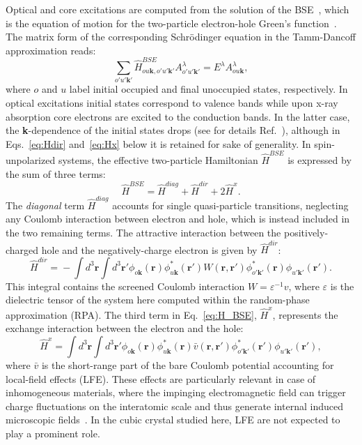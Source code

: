 \documentclass[aps,pra,superscriptaddress,twocolumn]{revtex4}
\begin{document}
Optical and core excitations are computed from the solution of the BSE~\cite{salp-beth51pr}, which is the equation of motion for the two-particle electron-hole Green's function~\cite{stri88rnc}.
The matrix form of the corresponding Schr\"odinger equation in the Tamm-Dancoff approximation reads:
%
\begin{equation}
\sum_{o'u'\mathbf{k'}} \hat{H}^{BSE}_{ou\mathbf{k},o'u'\mathbf{k'}} A^{\lambda}_{o'u'\mathbf{k'}} = E^{\lambda} A^{\lambda}_{ou\mathbf{k}} ,
\label{eq:BSE}
\end{equation}
%
where $o$ and $u$ label initial occupied and final unoccupied states, respectively.
In optical excitations initial states correspond to valence bands while upon x-ray absorption core electrons are excited to the conduction bands.
In the latter case, the \textbf{k}-dependence of the initial states drops (see for details Ref.~\cite{vorw+17prb}), although in Eqs.~\eqref{eq:Hdir} and~\eqref{eq:Hx} below it is retained for sake of generality.
In spin-unpolarized systems, the effective two-particle Hamiltonian $\hat{H}^{BSE}$ is expressed by the sum of three terms:
%
\begin{equation}
\hat{H}^{BSE} = \hat{H}^{diag} + \hat{H}^{dir} + 2 \hat{H}^x.
\label{eq:H_BSE}
\end{equation}
%
The \textit{diagonal} term $\hat{H}^{diag}$ accounts for single quasi-particle transitions, neglecting any Coulomb interaction between electron and hole, which is instead included in the two remaining terms.
The attractive interaction between the positively-charged hole and the negatively-charge electron is given by $\hat{H}^{dir}$:
%
\begin{equation}
\hat{H}^{dir} \! \! = \! - \! \! \int \! \! \! d^3\mathbf{r} \! \!  \int \! \! d^3\mathbf{r}' \phi_{o\mathbf{k}} (\mathbf{r}) \phi^*_{u\mathbf{k}} (\mathbf{r}') W(\mathbf{r},\mathbf{r}') \phi^*_{o'\mathbf{k}'} (\mathbf{r}) \phi_{u'\mathbf{k}'} (\mathbf{r}').
\label{eq:Hdir}
\end{equation}
%
This integral contains the screened Coulomb interaction $W = \varepsilon^{-1} v$, where $\varepsilon$ is the dielectric tensor of the system here computed within the random-phase approximation (RPA).
The third term in Eq.~\eqref{eq:H_BSE}, $\hat{H}^x$, represents the exchange interaction between the electron and the hole:
%
\begin{equation}
\hat{H}^x = \int d^3\mathbf{r} \int d^3\mathbf{r}' \phi_{o\mathbf{k}} (\mathbf{r}) \phi^*_{u\mathbf{k}} (\mathbf{r}) \bar{v}(\mathbf{r},\mathbf{r}') \phi^*_{o'\mathbf{k}'} (\mathbf{r}') \phi_{u'\mathbf{k}'} (\mathbf{r}'),
\label{eq:Hx}
\end{equation}
%
where $\bar{v}$ is the short-range part of the bare Coulomb potential accounting for local-field effects (LFE).
These effects are particularly relevant in case of inhomogeneous materials, where the impinging electromagnetic field can trigger charge fluctuations on the interatomic scale and thus generate internal induced microscopic fields~\cite{wise63pr,aspn82ajp,onid+02rmp}.
In the cubic  crystal studied here, LFE are not expected to play a prominent role.
\end{document}
